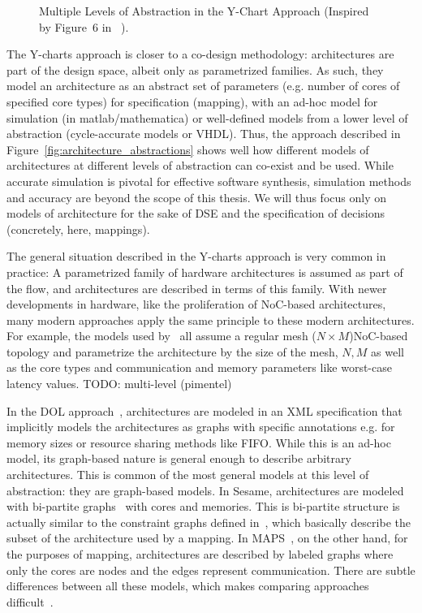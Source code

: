 \begin{figure}[h]
	\centering
\resizebox{0.8\textwidth}{!}{
   \begin{tikzpicture}
     
   \end{tikzpicture}
 }
   \caption{Multiple Levels of Abstraction in the Y-Chart Approach (Inspired by Figure~6 in ~\cite{kienhuis2001methodology}).}
   \label{fig:y_chart_abstractions}
\end{figure}

The Y-charts approach is closer to a co-design methodology: architectures are part of the design space, albeit only as parametrized families.
As such, they model an architecture as an abstract set of parameters (e.g. number of cores of specified core types) for specification (mapping), with an ad-hoc model for simulation (in matlab/mathematica) or well-defined models from a lower level of abstraction (cycle-accurate models or VHDL).
Thus, the approach described in Figure~\ref{fig:architecture_abstractions} shows well how different models of architectures at different levels of abstraction can co-exist and be used.
While accurate simulation is pivotal for effective software synthesis, simulation methods and accuracy are beyond the scope of this thesis.
We will thus focus only on models of architecture for the sake of \ac{DSE} and the specification of decisions (concretely, here, mappings).

The general situation described in the Y-charts approach is very common in practice: A parametrized family of hardware architectures is assumed as part of the flow, and architectures are described in terms of this family.
With newer developments in hardware, like the proliferation of \ac{NoC}-based architectures, many modern approaches apply the same principle to these modern architectures.
For example, the models used by~\cite{weichslgartner2014daarm,singh2010communication,richthammer2018search} all assume a regular mesh ($N \times M$)\ac{NoC}-based topology and parametrize the architecture by the size of the mesh, $N,M$ as well as the core types and communication and memory parameters like worst-case latency values.
TODO: multi-level (pimentel)

In the DOL approach~\cite{thiele2007DOL}, architectures are modeled in an XML specification that implicitly models the architectures as graphs with specific annotations e.g. for memory sizes or resource sharing methods like \ac{FIFO}. 
While this is an ad-hoc model, its graph-based nature is general enough to describe arbitrary architectures.
This is common of the most general models at this level of abstraction: they are graph-based models.
In Sesame, architectures are modeled with bi-partite graphs~\cite{erbas2006multiobjective} with cores and memories.
This is bi-partite structure is actually similar to the constraint graphs defined in~\cite{weichslgartner2014daarm,richthammer2018search}, which basically describe the subset of the architecture used by a mapping. 
In MAPS~\cite{maps}, on the other hand, for the purposes of mapping, architectures are described by labeled graphs where only the cores are nodes and the edges represent communication.
There are subtle differences between all these models, which makes comparing approaches difficult~\cite{goens_mcsoc16}.

